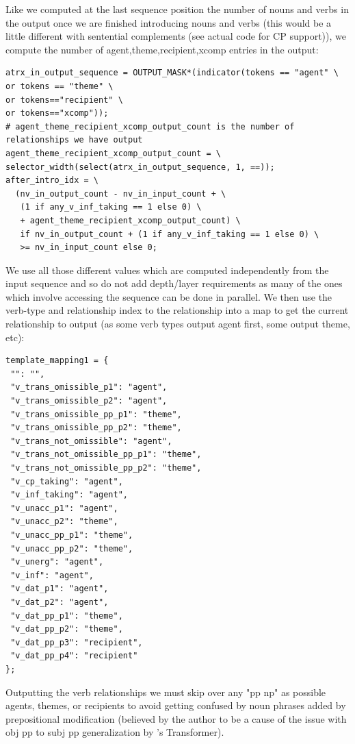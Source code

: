 \documentclass[11pt]{article}
\begin{document}
Like we computed at the last sequence position the number of nouns and verbs in the output once we are finished introducing nouns and verbs (this would be a little different with sentential complements (see actual code for CP support)), we compute the number of agent,theme,recipient,xcomp entries in the output:
\begin{tiny}
\begin{verbatim}
atrx_in_output_sequence = OUTPUT_MASK*(indicator(tokens == "agent" \
or tokens == "theme" \
or tokens=="recipient" \
or tokens=="xcomp"));
# agent_theme_recipient_xcomp_output_count is the number of relationships we have output
agent_theme_recipient_xcomp_output_count = \
selector_width(select(atrx_in_output_sequence, 1, ==));
after_intro_idx = \
  (nv_in_output_count - nv_in_input_count + \
   (1 if any_v_inf_taking == 1 else 0) \
   + agent_theme_recipient_xcomp_output_count) \
   if nv_in_output_count + (1 if any_v_inf_taking == 1 else 0) \
   >= nv_in_input_count else 0;
\end{verbatim}
\end{tiny}
\clearpage
We use all those different values which are computed independently from the input sequence and so do not add depth/layer requirements as many of the ones which involve accessing the sequence can be done in parallel. 
We then use the verb-type and relationship index to the relationship into a map to get the current relationship to output (as some verb types output agent first, some output theme, etc):
\begin{tiny}
\begin{verbatim}
template_mapping1 = {
 "": "",
 "v_trans_omissible_p1": "agent",
 "v_trans_omissible_p2": "agent",
 "v_trans_omissible_pp_p1": "theme",
 "v_trans_omissible_pp_p2": "theme",
 "v_trans_not_omissible": "agent",
 "v_trans_not_omissible_pp_p1": "theme",
 "v_trans_not_omissible_pp_p2": "theme",
 "v_cp_taking": "agent",
 "v_inf_taking": "agent",
 "v_unacc_p1": "agent",
 "v_unacc_p2": "theme",
 "v_unacc_pp_p1": "theme",
 "v_unacc_pp_p2": "theme",
 "v_unerg": "agent",
 "v_inf": "agent",
 "v_dat_p1": "agent",
 "v_dat_p2": "agent",
 "v_dat_pp_p1": "theme",
 "v_dat_pp_p2": "theme",
 "v_dat_pp_p3": "recipient",
 "v_dat_pp_p4": "recipient"
};
\end{verbatim}
\end{tiny}

Outputting the verb relationships we must skip over any "pp np" as possible agents, themes, or recipients to avoid getting confused by noun phrases added by prepositional modification (believed by the author to be a cause of the issue with obj pp to subj pp generalization by \cite{Wu2023}'s Transformer).
\end{document}
